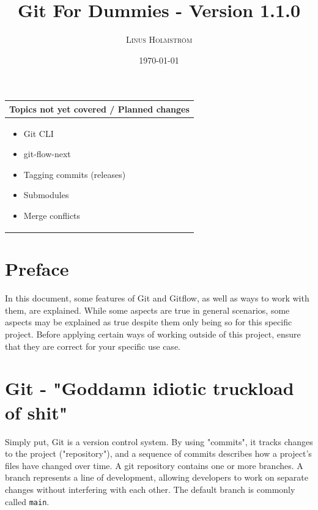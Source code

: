 \documentclass[12pt,a4paper]{article}
\title{Git For Dummies - Version 1.1.0\\\vspace{1mm}}
\author{\textsc{Linus Holmström}}
\date{\today}
\begin{document}
\maketitle

\vspace*{-12mm}

\begin{small}
\begin{longtable}{|p{13.3cm}|}
\hline
\textbf{Topics not yet covered / Planned changes} \\
\hline
\begin{itemize}
    \item Git CLI
    \item git-flow-next
    \item Tagging commits (releases)
    \item Submodules

    \item Merge conflicts
\end{itemize} \\ \hline
\end{longtable}
\end{small}

\setcounter{table}{0}  %


\setcounter{tocdepth}{2}
\tableofcontents

\newpage

\section{Preface}
    In this document, some features of Git and Gitflow, as well as ways to work with them, are explained. While some aspects are true in general scenarios, some aspects may be explained as true despite them only being so for this specific project. Before applying certain ways of working outside of this project, ensure that they are correct for your specific use case.

\section{Git - "Goddamn idiotic truckload of shit"}
\label{sec:git}
    Simply put, Git is a version control system. By using "commits", it tracks changes to the project ("repository"), and a sequence of commits describes how a project's files have changed over time. A git repository contains one or more branches. A branch represents a line of development, allowing developers to work on separate changes without interfering with each other. The default branch is commonly called \verb|main|.
    
\end{document}
